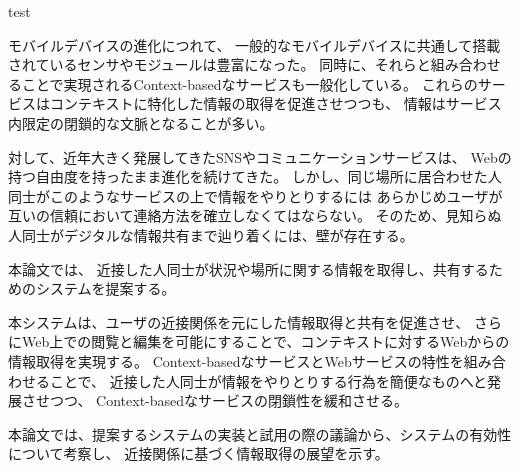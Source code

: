 test


\begin{jabstract}

モバイルデバイスの進化につれて、
一般的なモバイルデバイスに共通して搭載されているセンサやモジュールは豊富になった。
同時に、それらと組み合わせることで実現されるContext-basedなサービスも一般化している。
これらのサービスはコンテキストに特化した情報の取得を促進させつつも、
情報はサービス内限定の閉鎖的な文脈となることが多い。

対して、近年大きく発展してきたSNSやコミュニケーションサービスは、
Webの持つ自由度を持ったまま進化を続けてきた。
しかし、同じ場所に居合わせた人同士がこのようなサービスの上で情報をやりとりするには
あらかじめユーザが互いの信頼において連絡方法を確立しなくてはならない。
そのため、見知らぬ人同士がデジタルな情報共有まで辿り着くには、壁が存在する。

本論文では、
近接した人同士が状況や場所に関する情報を取得し、共有するためのシステムを提案する。

本システムは、ユーザの近接関係を元にした情報取得と共有を促進させ、
さらにWeb上での閲覧と編集を可能にすることで、コンテキストに対するWebからの情報取得を実現する。
Context-basedなサービスとWebサービスの特性を組み合わせることで、
近接した人同士が情報をやりとりする行為を簡便なものへと発展させつつ、
Context-basedなサービスの閉鎖性を緩和させる。

本論文では、提案するシステムの実装と試用の際の議論から、システムの有効性について考察し、
近接関係に基づく情報取得の展望を示す。


\end{jabstract}



